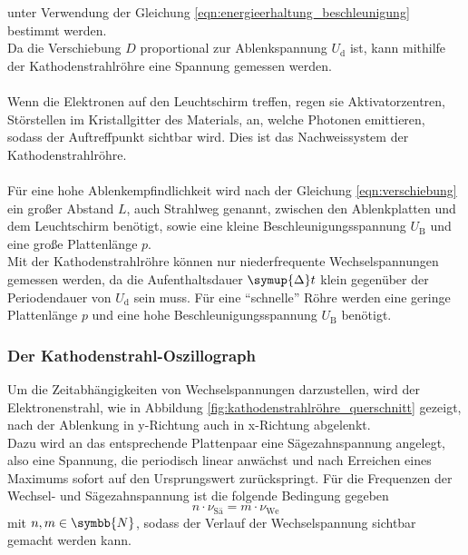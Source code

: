     unter Verwendung der Gleichung \ref{eqn:energieerhaltung_beschleunigung} bestimmt werden.\\
    Da die Verschiebung $D$ proportional zur Ablenkspannung $U_\text{d}$ ist,
    kann mithilfe der Kathodenstrahlröhre eine Spannung gemessen werden.\\
    \\
    Wenn die Elektronen auf den Leuchtschirm treffen,
    regen sie Aktivatorzentren,
    Störstellen im Kristallgitter des Materials,
    an,
    welche Photonen emittieren,
    sodass der Auftreffpunkt sichtbar wird.
    Dies ist das Nachweissystem der Kathodenstrahlröhre.\\
    \\
    Für eine hohe Ablenkempfindlichkeit wird nach der Gleichung \ref{eqn:verschiebung} ein großer Abstand $L$,
    auch Strahlweg genannt,
    zwischen den Ablenkplatten und dem Leuchtschirm benötigt,
    sowie eine kleine Beschleunigungsspannung $U_\text{B}$ und eine große Plattenlänge $p$.\\
    Mit der Kathodenstrahlröhre können nur niederfrequente Wechselspannungen gemessen werden,
    da die Aufenthaltsdauer $\symup{\Delta}t$ klein gegenüber der Periodendauer von $U_\text{d}$ sein muss.
    Für eine \enquote{schnelle} Röhre werden eine geringe Plattenlänge $p$ und eine hohe Beschleunigungsspannung $U_\text{B}$ benötigt.

\subsubsection{Der Kathodenstrahl-Oszillograph} 
\label{sec:oszillograph}

    Um die Zeitabhängigkeiten von Wechselspannungen darzustellen,
    wird der Elektronenstrahl,
    wie in Abbildung \ref{fig:kathodenstrahlröhre_querschnitt} gezeigt,
    nach der Ablenkung in y-Richtung auch in x-Richtung abgelenkt.\\
    Dazu wird an das entsprechende Plattenpaar eine Sägezahnspannung angelegt,
    also eine Spannung,
    die periodisch linear anwächst und nach Erreichen eines Maximums sofort auf den Ursprungswert zurückspringt.
    Für die Frequenzen der Wechsel- und Sägezahnspannung ist die folgende Bedingung gegeben
    \begin{equation}
        n \cdot \nu_\text{Sä} = m \cdot \nu_\text{We} 
        \label{eqn:synchronisationsbedingung}
    \end{equation}
    mit $n,m \in \symbb{N}$,
    sodass der Verlauf der Wechselspannung sichtbar gemacht werden kann.


